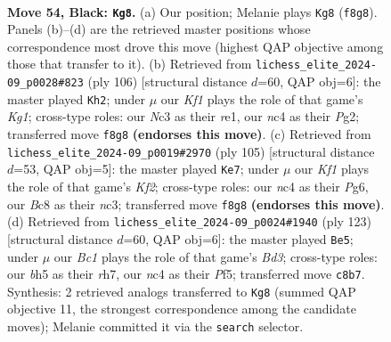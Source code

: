 \documentclass[11pt]{article}
\begin{document}
\clearpage

\begin{figure}[p]\centering
\begin{subfigure}{0.46\textwidth}\centering
\resizebox{\linewidth}{!}{%
\newchessgame
\chessboard[
  setfen={1nb2k2/r7/1P2p3/5pNB/1pN2P2/1Pn3P1/5K1P/1R6 b - - 0 54},
  showmover=false,
  pgfstyle=straightmove, color=movearrow, markmove={f8-g8}
]}
\caption{}
\end{subfigure}\hfill
\begin{subfigure}{0.46\textwidth}\centering
\resizebox{\linewidth}{!}{%
\newchessgame
\chessboard[
  setfen={8/5p1k/3p2p1/2n5/pR1N1p2/P6P/5PP1/4r1K1 w - - 2 54},
  showmover=false,
  pgfstyle=straightmove, color=movearrow, markmove={g1-h2}
]}
\caption{}
\end{subfigure}
\\[4pt]
\begin{subfigure}{0.46\textwidth}\centering
\resizebox{\linewidth}{!}{%
\newchessgame
\chessboard[
  setfen={r7/5k1p/1R1p2p1/2nPp3/4P3/2N2P2/P1K3P1/8 b - - 2 53},
  showmover=false,
  pgfstyle=straightmove, color=movearrow, markmove={f7-e7}
]}
\caption{}
\end{subfigure}\hfill
\begin{subfigure}{0.46\textwidth}\centering
\resizebox{\linewidth}{!}{%
\newchessgame
\chessboard[
  setfen={r7/P6R/3bk1p1/5pP1/1p5P/1PpN4/2P3K1/8 b - - 0 62},
  showmover=false,
  pgfstyle=straightmove, color=movearrow, markmove={d6-e5}
]}
\caption{}
\end{subfigure}
\caption{\textbf{Move 54, Black: \texttt{Kg8}.} (a) Our position; Melanie plays \texttt{Kg8} (\texttt{f8g8}). Panels (b)--(d) are the retrieved master positions whose correspondence most drove this move (highest QAP objective among those that transfer to it). (b) Retrieved from \texttt{lichess\_elite\_2024-09\_p0028\#823} (ply 106) [structural distance $d$=60, QAP obj=6]: the master played \texttt{Kh2}; under $\mu$ our \emph{Kf1} plays the role of that game's \emph{Kg1}; cross-type roles: our \emph{N}c3 as their \emph{r}e1, our \emph{n}c4 as their \emph{P}g2; transferred move \texttt{f8g8} \textbf{(endorses this move)}. (c) Retrieved from \texttt{lichess\_elite\_2024-09\_p0019\#2970} (ply 105) [structural distance $d$=53, QAP obj=5]: the master played \texttt{Ke7}; under $\mu$ our \emph{Kf1} plays the role of that game's \emph{Kf2}; cross-type roles: our \emph{n}c4 as their \emph{P}g6, our \emph{B}c8 as their \emph{n}c3; transferred move \texttt{f8g8} \textbf{(endorses this move)}. (d) Retrieved from \texttt{lichess\_elite\_2024-09\_p0024\#1940} (ply 123) [structural distance $d$=60, QAP obj=6]: the master played \texttt{Be5}; under $\mu$ our \emph{Bc1} plays the role of that game's \emph{Bd3}; cross-type roles: our \emph{b}h5 as their \emph{r}h7, our \emph{n}c4 as their \emph{P}f5; transferred move \texttt{c8b7}. Synthesis: 2 retrieved analogs transferred to \texttt{Kg8} (summed QAP objective 11, the strongest correspondence among the candidate moves); Melanie committed it via the \texttt{search} selector.}
\label{fig:thought-m107}
\end{figure}
\end{document}
